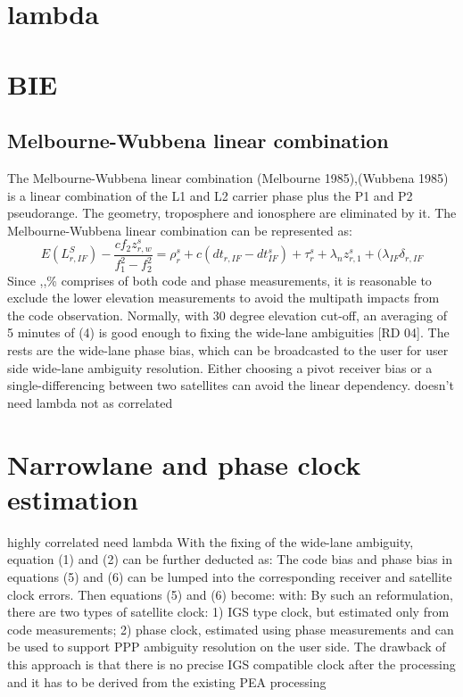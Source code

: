 \section{lambda}
\section{BIE}
\subsection{Melbourne-Wubbena linear combination}
The Melbourne-Wubbena linear combination (Melbourne 1985),(Wubbena 1985) is a linear combination of the L1 and L2 carrier phase plus the P1 and P2 pseudorange. The geometry, troposphere and ionosphere are eliminated by it. The Melbourne-Wubbena linear combination can be represented as:
%
\begin{equation}
E(L_{r,IF}^S) - \frac{cf_2z_{r,w}^s}{f_1^2 - f_2^2} = \rho_r^s + c(dt_{r,IF} - dt_{IF}^s) + \tau_r^s + \lambda_n z_{r,1}^s + (\lambda_{IF}\delta_{r,IF}
\end{equation}
%
Since ,,\% comprises of both code and phase measurements, it is reasonable to exclude the lower
elevation measurements to avoid the multipath impacts from the code observation. Normally, with
30 degree elevation cut-off, an averaging of 5 minutes of (4) is good enough to fixing the wide-lane
ambiguities [RD 04]. The rests are the wide-lane phase bias, which can be broadcasted to the user for
user side wide-lane ambiguity resolution. Either choosing a pivot receiver bias or a single-differencing
between two satellites can avoid the linear dependency. 
%
%
doesn't need lambda not as correlated
%
\section{Narrowlane and phase clock estimation}
%
highly correlated need lambda
%
%
With the fixing of the wide-lane ambiguity, equation (1) and (2) can be further deducted as:
%
The code bias and phase bias in equations (5) and (6) can be lumped into the corresponding receiver
and satellite clock errors. Then equations (5) and (6) become:
%
with:
%
By such an reformulation, there are two types of satellite clock: 1) IGS type clock, but estimated only
from code measurements; 2) phase clock, estimated using phase measurements and can be used to
support PPP ambiguity resolution on the user side. The drawback of this approach is that there is no
precise IGS compatible clock after the processing and it has to be derived from the existing PEA
processing
%
